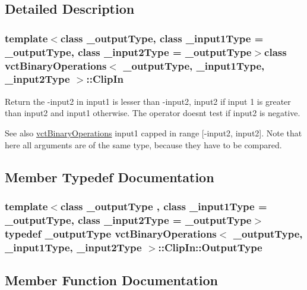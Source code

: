 \subsection{Detailed Description}
\subsubsection*{template$<$class \+\_\+output\+Type, class \+\_\+input1\+Type = \+\_\+output\+Type, class \+\_\+input2\+Type = \+\_\+output\+Type$>$class vct\+Binary\+Operations$<$ \+\_\+output\+Type, \+\_\+input1\+Type, \+\_\+input2\+Type $>$\+::\+Clip\+In}

Return the -\/input2 in input1 is lesser than -\/input2, input2 if input 1 is greater than input2 and input1 otherwise. The operator doesn\textquotesingle{}t test if input2 is negative. 

\begin{DoxySeeAlso}{See also}
\hyperlink{classvct_binary_operations}{vct\+Binary\+Operations} input1 capped in range \mbox{[}-\/input2, input2\mbox{]}. Note that here all arguments are of the same type, because they have to be compared. 
\end{DoxySeeAlso}


\subsection{Member Typedef Documentation}
\hypertarget{classvct_binary_operations_1_1_clip_in_ad09cdc8a73a37ea74b60e83b670db658}{}
\subsubsection[{Output\+Type}]{\setlength{\rightskip}{0pt plus 5cm}template$<$class \+\_\+output\+Type , class \+\_\+input1\+Type  = \+\_\+output\+Type, class \+\_\+input2\+Type  = \+\_\+output\+Type$>$ typedef \+\_\+output\+Type {\bf vct\+Binary\+Operations}$<$ \+\_\+output\+Type, \+\_\+input1\+Type, \+\_\+input2\+Type $>$\+::{\bf Clip\+In\+::\+Output\+Type}}\label{classvct_binary_operations_1_1_clip_in_ad09cdc8a73a37ea74b60e83b670db658}


\subsection{Member Function Documentation}
\hypertarget{classvct_binary_operations_1_1_clip_in_ab758c32bbb4a9a69c5ef1e2186d4f222}{}
